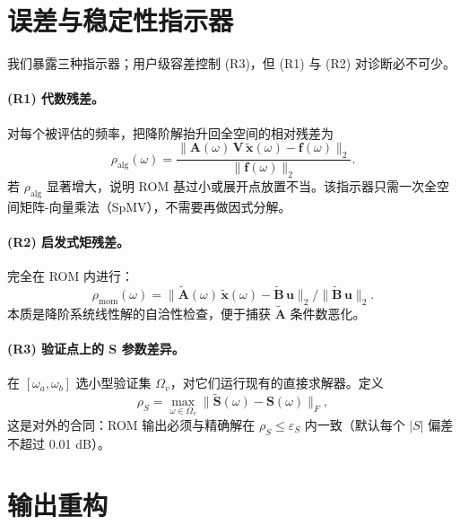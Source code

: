 \documentclass[11pt,a4paper]{ctexart}
\begin{document}
\section{误差与稳定性指示器}\label{sec:residual}

我们暴露三种指示器；用户级容差控制 (R3)，但 (R1) 与 (R2) 对诊断必不可少。

\paragraph{(R1) 代数残差。}
对每个被评估的频率，把降阶解抬升回全空间的相对残差为
\begin{equation}
  \rho_{\mathrm{alg}}(\omega) =
  \frac{\|\bm A(\omega)\,\bm V\,\widetilde{\bm x}(\omega) - \bm f(\omega)\|_2}
       {\|\bm f(\omega)\|_2}.
\end{equation}
若 $\rho_{\mathrm{alg}}$ 显著增大，说明 ROM 基过小或展开点放置不当。该指示器只需一次全空间矩阵-向量乘法（SpMV），不需要再做因式分解。

\paragraph{(R2) 启发式矩残差。}
完全在 ROM 内进行：
\begin{equation}
  \rho_{\mathrm{mom}}(\omega) =
  \|\widetilde{\bm A}(\omega)\,\widetilde{\bm x}(\omega) - \widetilde{\bm B}\,\bm u\|_2
  / \|\widetilde{\bm B}\,\bm u\|_2.
\end{equation}
本质是降阶系统线性解的自洽性检查，便于捕获 $\widetilde{\bm A}$ 条件数恶化。

\paragraph{(R3) 验证点上的 S 参数差异。}
在 $[\omega_a,\omega_b]$ 选小型验证集 $\Omega_v$，对它们运行现有的直接求解器。定义
\begin{equation}
  \rho_S = \max_{\omega\in\Omega_v} \big\|\widetilde{\bm S}(\omega)-\bm S(\omega)\big\|_F,
\end{equation}
这是对外的合同：ROM 输出必须与精确解在 $\rho_S \le \varepsilon_S$ 内一致（默认每个 $|S|$ 偏差不超过 0.01 dB）。

\section{输出重构}
\end{document}
